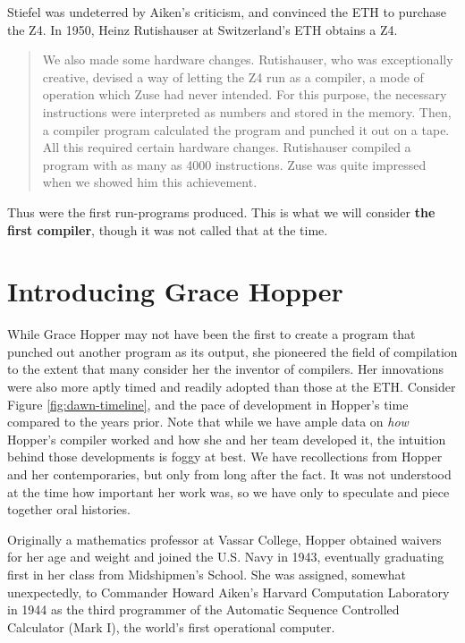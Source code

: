 Stiefel was undeterred by Aiken's criticism, and convinced the ETH to purchase the Z4.
In 1950, Heinz Rutishauser at Switzerland's ETH obtains a Z4.

\begin{quotation}
    We also made some hardware changes. Rutishauser, who was exceptionally creative, devised a way of
letting the Z4 run as a compiler, a mode of operation which Zuse had never intended. For this purpose, the
necessary instructions were interpreted as numbers and stored in the memory. Then, a compiler program
calculated the program and punched it out on a tape. All this required certain hardware changes. Rutishauser
compiled a program with as many as 4000 instructions. Zuse was quite impressed when we showed him this
achievement.\cite{konrad_zuses_z4_2000}
\end{quotation}

Thus were the first run-programs produced.
This is what we will consider \textbf{the first compiler}, though it was not called that at the time.

\section{Introducing Grace Hopper}

While Grace Hopper may not have been the first to create a program that
punched out another program as its output, she pioneered the field of
compilation to the extent that many consider her the inventor of compilers.
Her innovations were also more aptly timed and readily adopted than those at the ETH.
Consider Figure \ref{fig:dawn-timeline}, and the pace of development in Hopper's time
compared to the years prior.
Note that while we have ample data on \textit{how} Hopper's compiler worked and how
she and her team developed it, the intuition behind those developments is foggy at best.
We have recollections from Hopper and her contemporaries, but only from long after the fact.
It was not understood at the time how important her work was, so we have
only to speculate and piece together oral histories.

Originally a mathematics professor at Vassar College, Hopper obtained waivers for her age and weight and
joined the U.S. Navy in 1943, eventually graduating first in her class from Midshipmen's School.
She was assigned, somewhat unexpectedly, to Commander Howard Aiken's Harvard Computation Laboratory in 1944
as the third programmer of the Automatic Sequence Controlled Calculator (Mark I), 
the world's first operational computer.

